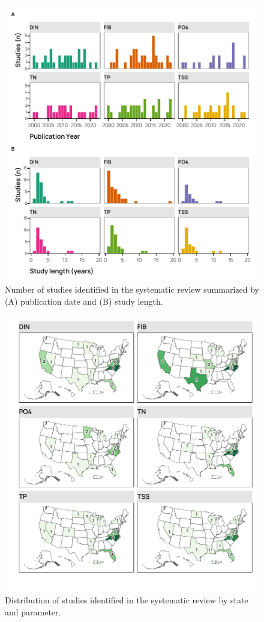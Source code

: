 \documentclass[utf8]{FrontiersinHarvard}
\begin{document}
\begin{figure}
\includegraphics[width=1\linewidth,]{../figures/bmp_temporal_summary} \caption{Number of studies identified in the systematic review summarized by (A) publication date and (B) study length.}\label{fig:bmptemporal}
\end{figure}

\begin{figure}[p]
\includegraphics[width=1\linewidth,]{../figures/study_map} \caption{Distribution of studies identified in the systematic review by state and parameter.}\label{fig:studymap}
\end{figure}
\end{document}
